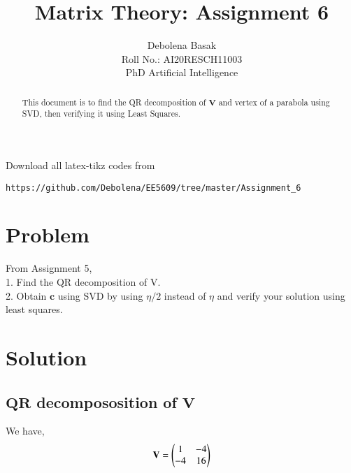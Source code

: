 \documentclass[journal,12pt,twocolumn]{IEEEtran}
\begin{document}
\makeatletter
{}
\makeatother
\let\StandardTheFigure\thefigure
\let\vec\mathbf
\renewcommand{\thefigure}{\theproblem}
\def\putbox#1#2#3{\makebox[0in][l]{\makebox[#1][l]{}\raisebox{\baselineskip}[0in][0in]{\raisebox{#2}[0in][0in]{#3}}}}
     \def\rightbox#1{\makebox[0in][r]{#1}}
     \def\centbox#1{\makebox[0in]{#1}}
     \def\topbox#1{\raisebox{-\baselineskip}[0in][0in]{#1}}
     \def\midbox#1{\raisebox{-0.5\baselineskip}[0in][0in]{#1}}
\vspace{3cm}
\title{Matrix Theory: Assignment 6}
\author{Debolena Basak\\ Roll No.: AI20RESCH11003\\ PhD Artificial Intelligence}

\maketitle
\newpage
\bigskip
\renewcommand{\thefigure}{\theenumi}
\renewcommand{\thetable}{\theenumi}


\begin{abstract}
This document is to find the QR decomposition of $\vec V$ and vertex of a parabola using SVD, then verifying it using Least Squares.
\end{abstract}

%
Download all latex-tikz codes from 
%
\begin{lstlisting}
https://github.com/Debolena/EE5609/tree/master/Assignment_6
\end{lstlisting}
%
\section{Problem}
From Assignment 5,\\
1. Find the QR decomposition of V.\\
2. Obtain $\vec{c}$ using SVD by using $\eta/2 $ instead of $\eta$ and verify your solution using least squares.

\section{Solution}
\subsection{$\vec{QR}$ decompososition of $\vec V$}
We have, 
\begin{align}
    \vec V = \myvec{1 & -4\\ -4 & 16} \label{eq:1}
\end{align}
\end{document}
